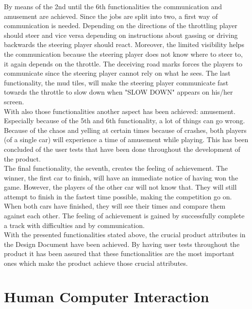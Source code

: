 \documentclass[11pt,twoside,a4paper]{article}
\begin{document}
By means of the 2nd until the 6th functionalities the communication and amusement are achieved. Since the jobs are split into two, a first way of communication is needed. Depending on the directions of the throttling player should steer and vice versa depending on instructions about gassing or driving backwards the steering player should react. Moreover, the limited visibility helps the communication because the steering player does not know where to steer to, it again depends on the throttle. The deceiving road marks forces the players to communicate since the steering player cannot rely on what he sees. The last functionality, the mud tiles, will make the steering player communicate fast towards the throttle to slow down when "SLOW DOWN" appears on his/her screen. \\

With also those functionalities another aspect has been achieved: amusement. Especially because of the 5th and 6th functionality, a lot of things can go wrong. Because of the chaos and yelling at certain times because of crashes, both players (of a single car) will experience a time of amusement while playing. This has been concluded of the user tests that have been done throughout the development of the product. \\

The final functionality, the seventh, creates the feeling of achievement. The winner, the first car to finish, will have an immediate notice of having won the game. However, the players of the other car will not know that. They will still attempt to finish in the fastest time possible, making the competition go on. When both cars have finished, they will see their times and compare them against each other. The feeling of achievement is gained by successfully complete a track with difficulties and by communication. \\

With the presented functionalities stated above, the crucial product attributes in the Design Document have been achieved. By having user tests throughout the product it has been assured that these functionalities are the most important ones which make the product achieve those crucial attributes.

\clearpage

\section{Human Computer Interaction}
\end{document}
